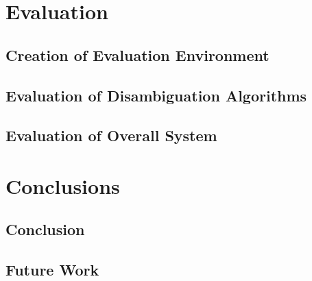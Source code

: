 \documentclass[12pt, a4paper]{report}
\begin{document}
\chapter{Evaluation}

\section{Creation of Evaluation Environment}

\section{Evaluation of Disambiguation Algorithms}


\section{Evaluation of Overall System}


\chapter{Conclusions}

\section{Conclusion}

\section{Future Work}




\end{document}
